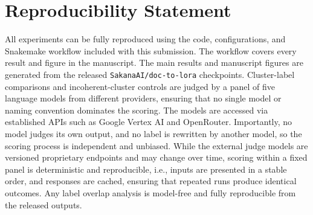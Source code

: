 \section*{Reproducibility Statement}
\label{sec:repro}

All experiments can be fully reproduced using the code, configurations, and Snakemake workflow included with this submission. 
The workflow covers every result and figure in the manuscript. The main results and manuscript figures are generated from the released \texttt{SakanaAI/doc-to-lora} checkpoints. 
Cluster-label comparisons and incoherent-cluster controls are judged by a panel of five language models from different providers, ensuring that no single model or naming convention dominates the scoring. The models are accessed via established APIs such as Google Vertex AI and OpenRouter. Importantly, no model judges its own output, and no label is rewritten by another model, so the scoring process is independent and unbiased.
While the external judge models are versioned proprietary endpoints and may change over time, scoring within a fixed panel is deterministic and reproducible, i.e.,  inputs are presented in a stable order, and responses are cached, ensuring that repeated runs produce identical outcomes. Any label overlap analysis is model-free and fully reproducible from the released outputs.
